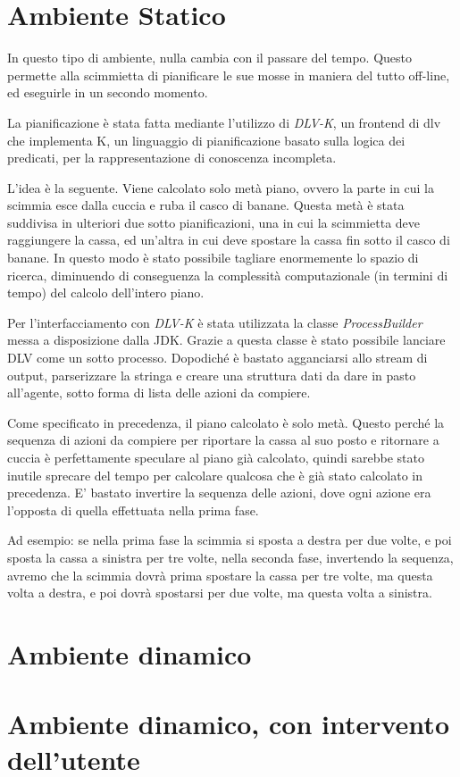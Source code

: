 \documentclass[a4paper,10pt]{article}
\begin{document}
    \section{Ambiente Statico}
	In questo tipo di ambiente, nulla cambia con il passare del tempo. Questo permette alla scimmietta di pianificare le sue mosse in
	maniera del tutto off-line, ed eseguirle in un secondo momento.
	
	La pianificazione è stata fatta mediante l'utilizzo di \emph{DLV-K}, un frontend di dlv che implementa K, un linguaggio di pianificazione
	basato sulla logica dei predicati, per la rappresentazione di conoscenza incompleta.
	
	L'idea è la seguente. Viene calcolato solo metà piano, ovvero la parte in cui la scimmia esce dalla cuccia e ruba il casco di banane.
	Questa metà è stata suddivisa in ulteriori due sotto pianificazioni, una in cui la scimmietta deve raggiungere
	la cassa, ed un'altra in cui deve spostare la cassa fin sotto il casco di banane. In questo modo è stato possibile tagliare enormemente
	lo spazio di ricerca, diminuendo di conseguenza la complessità computazionale (in termini di tempo) del calcolo dell'intero piano.
	
	Per l'interfacciamento con \emph{DLV-K} è stata utilizzata la classe \emph{ProcessBuilder} messa a disposizione dalla JDK.
	Grazie a questa classe è stato possibile lanciare DLV come un sotto processo.
	Dopodiché è bastato agganciarsi allo stream di output, parserizzare
	la stringa e creare una struttura dati da dare in pasto all'agente, sotto forma di lista delle azioni da compiere.
	
	Come specificato in precedenza, il piano calcolato è solo metà. Questo perché la sequenza di azioni
	da compiere per riportare la cassa al suo posto e ritornare a cuccia è perfettamente speculare al piano già calcolato, quindi
	sarebbe stato inutile sprecare del tempo per calcolare qualcosa che è già stato calcolato in precedenza. E' bastato
	invertire la sequenza delle azioni, dove ogni azione era l'opposta di quella effettuata nella prima fase.
	
	Ad esempio: se nella prima fase la scimmia si sposta a destra per due volte, e poi sposta la cassa a sinistra per tre volte,
	nella seconda fase, invertendo la sequenza, avremo che la scimmia dovrà
	prima spostare la cassa per tre volte, ma questa volta a destra, e poi dovrà spostarsi per due volte, ma questa volta a sinistra.
	
    \section{Ambiente dinamico}

    \section{Ambiente dinamico, con intervento dell'utente}
\end{document}
